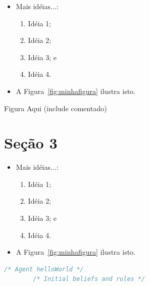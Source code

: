 \documentclass[a0,portrait]{a0poster}
\newcommand\itemadjust{\itemsep.5em \parskip0pt \parsep0pt}
\begin{document}
\begin{multicols}{2}
\vspace{13mm}


\begin{itemize}
	\item Mais idéias...:
	\begin{enumerate}
		[leftmargin=2em]\itemadjust
		\item Idéia 1;
		\item Idéia 2; 
		\item Idéia 3; e
		\item Idéia 4.
	\end{enumerate}	
	\item A Figura~\ref{fig:minhafigura} ilustra isto.
\end{itemize}
\vspace{13mm}

\begin{center}
	\Huge Figura Aqui (include comentado)
	\label{fig:minhafigura}
\end{center}	


\color{NavyBlue}
\section*{\huge Seção 3}
\color{Black}

\begin{itemize}
	\item Mais idéias...:
	\begin{enumerate}
		[leftmargin=2em]\itemadjust
		\item Idéia 1;
		\item Idéia 2; 
		\item Idéia 3; e
		\item Idéia 4.
	\end{enumerate}	
	\item A Figura~\ref{fig:minhafigura} ilustra isto.
\end{itemize}


\vspace{13mm}
\noindent\begin{minipage}{.235\textwidth}
	\begin{minipage}{\textwidth}
		\lstset{style=codeStyle}
		\begin{lstlisting}[language=Prolog, label={alg:exemplo-hello-world}, caption={Exemplo de programa em AgentSpeak(L).}]
		/* Agent helloWorld */
		/* Initial beliefs and rules */
		

\end{lstlisting}
\end{minipage}
\end{minipage}
\end{multicols}
\end{document}
